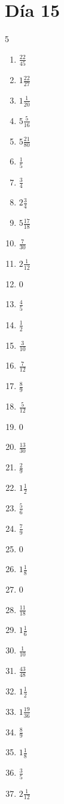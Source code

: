 \documentclass[12pt]{article}
\begin{document}
\section*{Día 15}
\begin{multicols}{5}\begin{enumerate}
\item $ \frac{22}{45} $
\item $ 1 \frac{22}{27} $
\item $ 1 \frac{1}{20} $
\item $ 5 \frac{5}{16} $
\item $ 5 \frac{21}{80} $
\item $ \frac{1}{5} $
\item $ \frac{3}{4} $
\item $ 2 \frac{3}{4} $
\item $ 5 \frac{17}{18} $
\item $ \frac{7}{30} $
\item $ 2 \frac{1}{12} $
\item $ 0 $
\item $ \frac{4}{5} $
\item $ \frac{1}{2} $
\item $ \frac{3}{10} $
\item $ \frac{7}{12} $
\item $ \frac{8}{9} $
\item $ \frac{5}{12} $
\item $ 0 $
\item $ \frac{13}{30} $
\item $ \frac{2}{9} $
\item $ 1 \frac{1}{2} $
\item $ \frac{5}{6} $
\item $ \frac{7}{9} $
\item $ 0 $
\item $ 1 \frac{1}{8} $
\item $ 0 $
\item $ \frac{11}{18} $
\item $ 1 \frac{1}{6} $
\item $ \frac{1}{10} $
\item $ \frac{43}{48} $
\item $ 1 \frac{1}{2} $
\item $ 1 \frac{19}{36} $
\item $ \frac{8}{9} $
\item $ 1 \frac{1}{8} $
\item $ \frac{3}{5} $
\item $ 2 \frac{1}{12} $

\end{enumerate}
\end{multicols}
\end{document}
